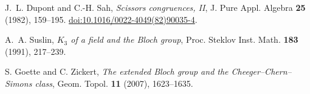 J.~L. Dupont and C.-H. Sah,
\emph{Scissors congruences, II},
J. Pure Appl. Algebra \textbf{25} (1982), 159--195.
\href{https://doi.org/10.1016/0022-4049(82)90035-4}{doi:10.1016/0022-4049(82)90035-4}.

A.~A. Suslin,
\emph{$K_3$ of a field and the Bloch group},
Proc. Steklov Inst. Math. \textbf{183} (1991), 217--239.

S. Goette and C. Zickert,
\emph{The extended Bloch group and the Cheeger--Chern--Simons class},
Geom. Topol. \textbf{11} (2007), 1623--1635.
